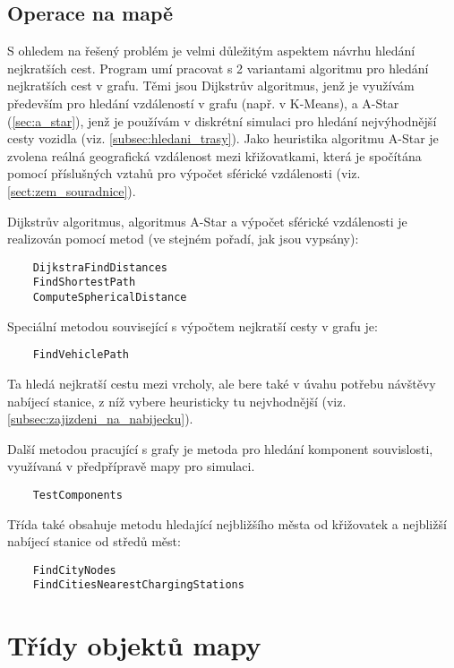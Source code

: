 \subsection{Operace na mapě}

S ohledem na řešený problém je velmi důležitým aspektem návrhu hledání 
nejkratších cest. Program umí pracovat s 2 variantami algoritmu pro hledání
nejkratších cest v grafu. Těmi jsou Dijkstrův algoritmus, jenž je využívám
především pro hledání vzdáleností v grafu (např. v K-Means), a A-Star 
(\cref{sec:a_star}), jenž je používám v diskrétní simulaci pro hledání 
nejvýhodnější cesty vozidla (viz. \cref{subsec:hledani_trasy}).
Jako heuristika algoritmu A-Star je zvolena reálná geografická vzdálenost
mezi křižovatkami, která je spočítána pomocí příslušných vztahů pro výpočet
sférické vzdálenosti (viz. \cref{sect:zem_souradnice}). 

Dijkstrův algoritmus, algoritmus A-Star a výpočet sférické vzdálenosti je realizován
pomocí metod (ve stejném pořadí, jak jsou vypsány):

\begin{Verbatim}
    DijkstraFindDistances
    FindShortestPath
    ComputeSphericalDistance
\end{Verbatim}

Speciální metodou související s výpočtem nejkratší cesty v grafu je:

\begin{Verbatim}
    FindVehiclePath
\end{Verbatim}

Ta hledá nejkratší cestu mezi vrcholy, ale bere také v úvahu potřebu návštěvy nabíjecí
stanice, z níž vybere heuristicky tu nejvhodnější (viz. \cref{subsec:zajizdeni_na_nabijecku}).

Další metodou pracující s grafy je metoda pro hledání komponent souvislosti, 
využívaná v předpřípravě mapy pro simulaci.

\begin{Verbatim}
    TestComponents
\end{Verbatim}

Třída také obsahuje metodu hledající nejbližšího města od křižovatek a nejbližší
nabíjecí stanice od středů měst:

\begin{Verbatim}
    FindCityNodes
    FindCitiesNearestChargingStations
\end{Verbatim}


\section{Třídy objektů mapy}

